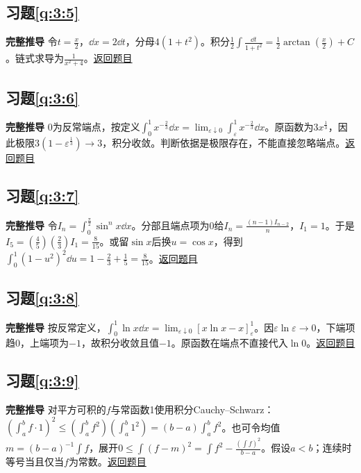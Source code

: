 \subsection*{习题\ref{q:3:5}}\label{a:3:5}\textbf{完整推导} 令$t=\frac{x}{2}$，$\dd x=2\dd t$，分母$4(1+t^2)$。积分$\frac12\int\frac{\dd t}{1+t^2}=\frac12\arctan(\frac{x}{2})+C$。链式求导为$\frac{1}{x^2+4}$。\quad\hyperref[q:3:5]{返回题目}

\subsection*{习题\ref{q:3:6}}\label{a:3:6}\textbf{完整推导} 0为反常端点，按定义$\int_0^1x^{-\frac{2}{3}}\dd x=\lim_{\varepsilon\downarrow0}\int_\varepsilon^1x^{-\frac{2}{3}}\dd x$。原函数为$3x^{\frac{1}{3}}$，因此极限$3(1-\varepsilon^{\frac{1}{3}})\to3$，积分收敛。判断依据是极限存在，不能直接忽略端点。\quad\hyperref[q:3:6]{返回题目}

\subsection*{习题\ref{q:3:7}}\label{a:3:7}\textbf{完整推导} 令$I_n=\int_0^{\frac{\pi}{2}}\sin^nx\dd x$。分部且端点项为0给$I_n=\frac{(n-1)I_{n-2}}{n}$，$I_1=1$。于是$I_5=(\frac{4}{5})(\frac{2}{3})I_1=\frac{8}{15}$。或留$\sin x$后换$u=\cos x$，得到$\int_0^1(1-u^2)^2\dd u=1-\frac{2}{3}+\frac{1}{5}=\frac{8}{15}$。\quad\hyperref[q:3:7]{返回题目}

\subsection*{习题\ref{q:3:8}}\label{a:3:8}\textbf{完整推导} 按反常定义，$\int_0^1\ln x\dd x=\lim_{\varepsilon\downarrow0}[x\ln x-x]_\varepsilon^1$。因$\varepsilon\ln\varepsilon\to0$，下端项趋0，上端项为$-1$，故积分收敛且值$-1$。原函数在端点不直接代入$\ln0$。\quad\hyperref[q:3:8]{返回题目}

\subsection*{习题\ref{q:3:9}}\label{a:3:9}\textbf{完整推导} 对平方可积的$f$与常函数1使用积分Cauchy--Schwarz：$(\int_a^bf\cdot1)^2\le(\int_a^bf^2)(\int_a^b1^2)=(b-a)\int_a^bf^2$。也可令均值$m=(b-a)^{-1}\int f$，展开$0\le\int(f-m)^2=\int f^2-\frac{(\int f)^2}{b-a}$。假设$a<b$；连续时等号当且仅当$f$为常数。\quad\hyperref[q:3:9]{返回题目}


